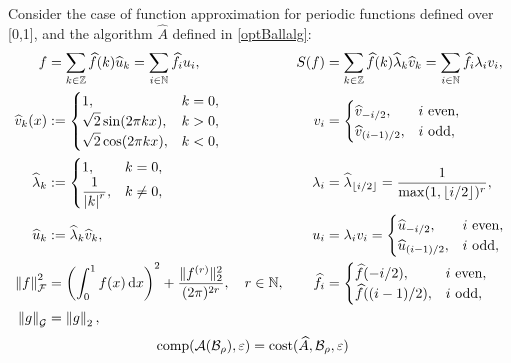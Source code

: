 \documentclass[graybox,footinfo]{svmult}
\newcommand{\DHJRnorm}[2][{}]{\ensuremath{\left \lVert #2 \right \rVert}_{#1}}
\newcommand{\DHJRnormnorm}[2][{}]{\ensuremath{\lVert #2 \rVert}_{#1}}
\newcommand{\DHJRabs}[1]{\ensuremath{{\left \lvert #1 \right \rvert}}}
\begin{document}
\begin{example}\label{exam:exam1} Consider the case of function approximation for periodic functions defined over [0,1], and the algorithm $\widehat{A}$ defined in \eqref{optBallalg}:
	\begin{align*}
	f &= \sum_{k \in \bbZ} \widehat{f}(k) \widehat{u}_{k}  = \sum_{i \in \bbN} \widehat{f}_i u_i, 
	& S(f) & = \sum_{k \in \bbZ} \widehat{f}(k) \widehat{\lambda}_k \widehat{v}_k = \sum_{i \in \bbN} \widehat{f}_i \lambda_i v_i, \\
	\widehat{v}_{k} (x) &:= \begin{cases} 1, & k = 0, \\
	\displaystyle \sqrt{2} \sin(2\pi k x), & k > 0, \\
	\displaystyle \sqrt{2} \cos(2\pi k x), & k < 0, \\
	\end{cases} 
	& v_i &= \begin{cases} \widehat{v}_{-i/2}, & i \text{ even},\\
	\widehat{v}_{(i-1)/2}, & i \text{ odd},
	\end{cases} \\
	\widehat{\lambda}_{k} &:= \begin{cases} 1, & k = 0, \\
	\displaystyle \frac{1}{\DHJRabs{k}^r}, & k \ne 0,
	\end{cases}
	& \lambda_i &= \widehat{\lambda}_{\lfloor i/2\rfloor} = \frac{1}{\max(1,\lfloor i/2\rfloor)^r}, \\
	\widehat{u}_{k} &:=  \widehat{\lambda}_k \widehat{v}_k,
	& u_i & = \lambda_i v_i = \begin{cases} \widehat{u}_{-i/2}, & i \text{ even},\\
	\widehat{u}_{(i-1)/2}, & i \text{ odd},
	\end{cases}
	\\
		\DHJRnorm[\calF]{f}^2 & = \left( \int_0^1 f(x) \, \D x \right)^2 + \frac{\DHJRnormnorm[2]{f^{(r)}}^2}{(2 \pi)^{2r}}, \quad r \in \N, 
	&\widehat{f}_i& = \begin{cases} \widehat{f}(-i/2), & i \text{ even},\\
	\widehat{f}((i-1)/2), & i \text{ odd},
	\end{cases}
		\\
		\DHJRnorm[\calG]{g}& = \DHJRnorm[2]{g},
	\end{align*}
	\begin{align*}
	\textup{comp}(\calA(\calB_{\rho}),\varepsilon) &= \textup{cost}(\widehat{A},\calB_{\rho},\varepsilon) 

\end{align*}
\end{example}
\end{document}
